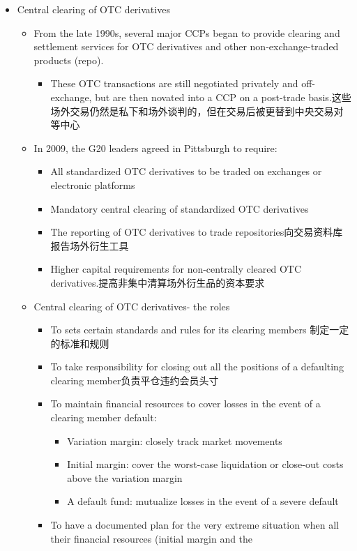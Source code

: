 \begin{itemize}
\item Central clearing of OTC derivatives
\begin{itemize}
\item From the late 1990s, several major CCPs began to provide
clearing and settlement services for OTC derivatives and other
non-exchange-traded products (repo).
\begin{itemize}
\item These OTC transactions are still negotiated privately and off-exchange, but are then novated into a CCP on a post-trade basis.这些场外交易仍然是私下和场外谈判的，但在交易后被更替到中央交易对等中心
\end{itemize}
\item In 2009, the G20 leaders agreed in Pittsburgh to require:
\begin{itemize}
\item All standardized OTC derivatives to be traded on exchanges or electronic platforms
\item Mandatory central clearing of standardized OTC derivatives
\item The reporting of OTC derivatives to trade repositories向交易资料库报告场外衍生工具
\item Higher capital requirements for non-centrally cleared OTC derivatives.提高非集中清算场外衍生品的资本要求
\end{itemize}
\item Central clearing of OTC derivatives- the roles
\begin{itemize}
\item To sets certain standards and rules for its clearing members
制定一定的标准和规则
\item To take responsibility for closing out all the positions of a defaulting clearing member负责平仓违约会员头寸
\item To maintain financial resources to cover losses in the event of a clearing member default:
\begin{itemize}
    \item Variation margin: closely track market movements
    \item Initial margin: cover the worst-case liquidation or close-out costs above the variation margin
    \item A default fund: mutualize losses in the event of a severe default
\end{itemize}
\item To have a documented plan for the very extreme situation
when all their financial resources (initial margin and the

\end{itemize}
\end{itemize}
\end{itemize}
